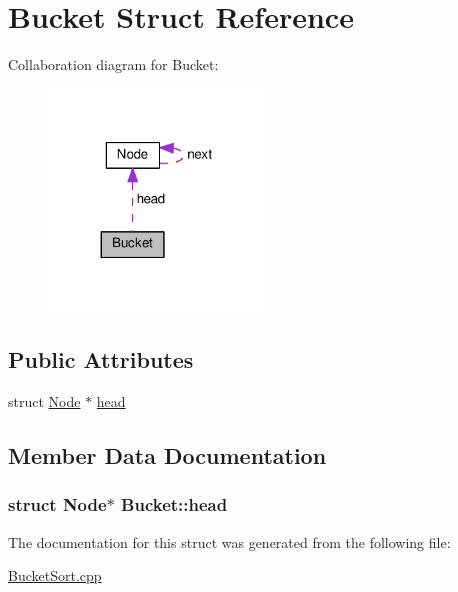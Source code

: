 \hypertarget{structBucket}{}\section{Bucket Struct Reference}
\label{structBucket}


Collaboration diagram for Bucket\+:
\nopagebreak
\begin{figure}[H]
\begin{center}
\leavevmode
\includegraphics[width=164pt]{structBucket__coll__graph}
\end{center}
\end{figure}
\subsection*{Public Attributes}
\begin{DoxyCompactItemize}
\item 
struct \hyperlink{structNode}{Node} $\ast$ \hyperlink{structBucket_afa23129a049b6cb4ad5403a5662b938f}{head}
\end{DoxyCompactItemize}


\subsection{Member Data Documentation}
\subsubsection[{\texorpdfstring{head}{head}}]{\setlength{\rightskip}{0pt plus 5cm}struct {\bf Node}$\ast$ Bucket\+::head}\hypertarget{structBucket_afa23129a049b6cb4ad5403a5662b938f}{}\label{structBucket_afa23129a049b6cb4ad5403a5662b938f}


The documentation for this struct was generated from the following file\+:\begin{DoxyCompactItemize}
\item 
\hyperlink{BucketSort_8cpp}{Bucket\+Sort.\+cpp}\end{DoxyCompactItemize}
